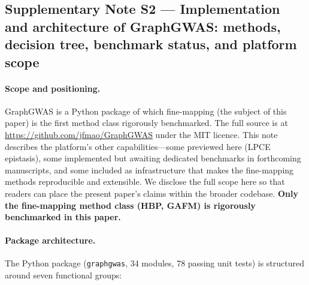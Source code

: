 \clearpage

\subsection*{Supplementary Note S2 --- Implementation and architecture of GraphGWAS: methods, decision tree, benchmark status, and platform scope}\label{snote:platform}

\paragraph{Scope and positioning.}
GraphGWAS is a Python package of which fine-mapping (the subject
of this paper) is the first method class rigorously benchmarked.
The full source is at \url{https://github.com/jfmao/GraphGWAS}
under the MIT licence. This note describes the platform's other
capabilities---some previewed here (LPCE epistasis), some
implemented but awaiting dedicated benchmarks in forthcoming
manuscripts, and some included as infrastructure that makes the
fine-mapping methods reproducible and extensible. We disclose the
full scope here so that readers can place the present paper's
claims within the broader codebase. \textbf{Only the fine-mapping
method class (HBP, GAFM) is rigorously benchmarked in this
paper.}

\paragraph{Package architecture.}
The Python package (\texttt{graphgwas}, 34 modules, 78 passing
unit tests) is structured around seven functional groups:

